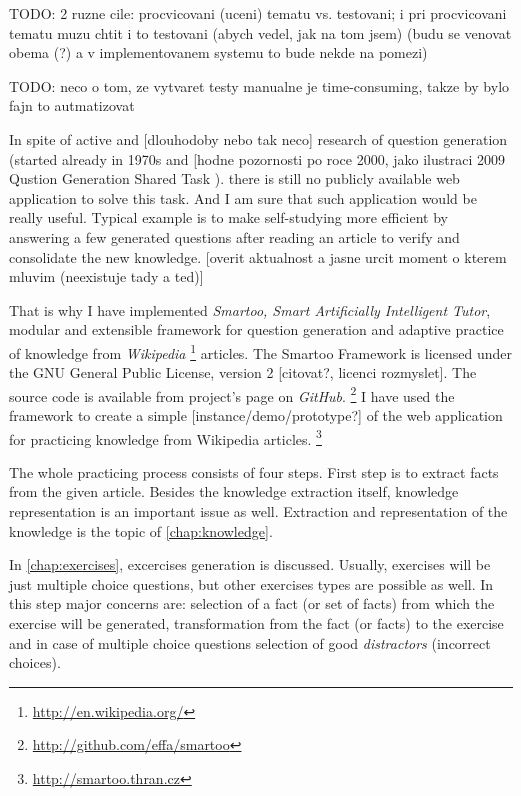 \documentclass[a4paper, 12pt, twoside]{fithesis2}		%
\renewcommand{\_}{\leavevmode \kern0.07em\vbox{\hrule width0.4em}}
\newcounter{choice}
\begin{document}
TODO: 2 ruzne cile: procvicovani (uceni) tematu vs. testovani; i pri procvicovani tematu muzu chtit i to testovani (abych vedel, jak na tom jsem) (budu se venovat obema (?) a v implementovanem systemu to bude nekde na pomezi)

TODO: neco o tom, ze vytvaret testy manualne je time-consuming, takze by bylo fajn to autmatizovat

In spite of active and [dlouhodoby nebo tak neco] research of question generation
(started already in 1970s \parencite{questions-wolfe} and [hodne pozornosti po roce 2000, jako ilustraci 2009 Qustion Generation Shared Task \cite{shared-task2009}).
there is still no publicly available web application to solve this task.
And I am sure that such application would be really useful. Typical example is to make self-studying more efficient by answering a few generated questions after reading an article to verify and consolidate the new knowledge.
[overit aktualnost a jasne urcit moment o kterem mluvim (neexistuje tady a ted)]

That is why I have implemented \textit{Smartoo, Smart Artificially Intelligent Tutor}, modular and extensible framework for question generation and adaptive practice
of knowledge from \emph{Wikipedia}%
\footnote{\url{http://en.wikipedia.org/}}
articles.
The Smartoo Framework is licensed under the GNU General Public License, version 2 [citovat?, licenci rozmyslet].
The source code is available from project's page on \textit{GitHub}.%
\footnote{\url{http://github.com/effa/smartoo}}
I have used the framework to create a simple [instance/demo/prototype?] of the web application for practicing knowledge from Wikipedia articles.%
\footnote{\url{http://smartoo.thran.cz}}

The whole practicing process consists of four steps.
First step is to extract facts from the given article.
Besides the knowledge extraction itself, knowledge representation is an important issue as well.
Extraction and representation of the knowledge is the topic of \autoref{chap:knowledge}.

In \autoref{chap:exercises}, excercises generation is discussed.
Usually, exercises will be just multiple choice questions, but other exercises types are possible as well.
In this step major concerns are: selection of a fact (or set of facts) from which the exercise will be generated, transformation from the fact (or facts) to the exercise and in case of multiple choice questions selection of good \textit{distractors} (incorrect choices).
\end{document}
